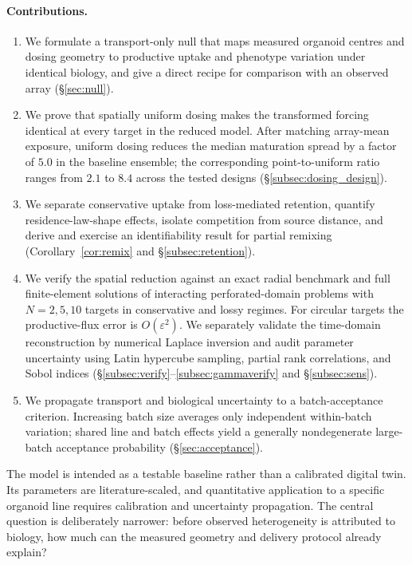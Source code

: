 \documentclass[pdflatex,sn-mathphys-num]{sn-jnl}
\numberwithin{equation}{section}
\theoremstyle{thmstyleone}%
\theoremstyle{definition}
\theoremstyle{remark}
\begin{document}
\paragraph{Contributions.}
\begin{enumerate}[itemsep=2pt]
\item We formulate a transport-only null that maps measured organoid centres and dosing geometry to productive uptake and phenotype variation under identical biology, and give a direct recipe for comparison with an observed array (\S\ref{sec:null}).

\item We prove that spatially uniform dosing makes the transformed forcing identical at every target in the reduced model. After matching array-mean exposure, uniform dosing reduces the median maturation spread by a factor of $5.0$ in the baseline ensemble; the corresponding point-to-uniform ratio ranges
from $2.1$ to $8.4$ across the tested designs (\S\ref{subsec:dosing_design}).

\item We separate conservative uptake from loss-mediated retention, quantify residence-law-shape effects, isolate competition from source distance, and derive and exercise an identifiability result for partial remixing (Corollary~\ref{cor:remix} and \S\ref{subsec:retention}).

\item We verify the spatial reduction against an exact radial benchmark and full finite-element solutions of interacting perforated-domain problems with $N=2,5,10$ targets in conservative and lossy regimes. For circular targets the productive-flux error is $O(\varepsilon^2)$. We separately validate the time-domain reconstruction by numerical Laplace inversion and audit parameter uncertainty using Latin hypercube sampling, partial rank correlations, and Sobol indices (\S\ref{subsec:verify}--\ref{subsec:gammaverify} and \S\ref{subsec:sens}).

\item We propagate transport and biological uncertainty to a batch-acceptance criterion. Increasing batch size averages only independent within-batch variation; shared line and batch effects yield a generally nondegenerate large-batch acceptance probability (\S\ref{sec:acceptance}).
\end{enumerate}

The model is intended as a testable baseline rather than a calibrated digital twin. Its parameters are literature-scaled, and quantitative application to a specific organoid line requires calibration and uncertainty propagation. The central question is deliberately narrower: before observed heterogeneity is
attributed to biology, how much can the measured geometry and delivery protocol already explain?
\end{document}
